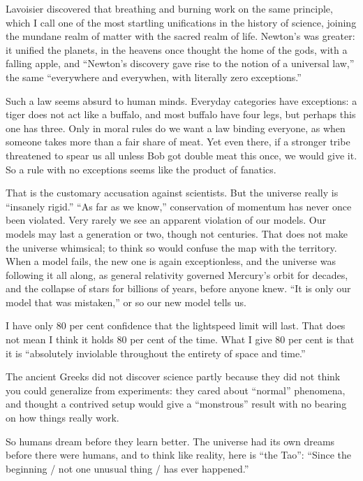 
Lavoisier discovered that breathing and burning work on the same principle, which I call one of the most startling unifications in the history of science, joining the mundane realm of matter with the sacred realm of life.  Newton's was greater: it unified the planets, in the heavens once thought the home of the gods, with a falling apple, and ``Newton's discovery gave rise to the notion of a universal law,'' the same ``everywhere and everywhen, with literally zero exceptions.'' 

Such a law seems absurd to human minds. Everyday categories have exceptions: a tiger does not act like a buffalo, and most buffalo have four legs, but perhaps this one has three. Only in moral rules do we want a law binding everyone, as when someone takes more than a fair share of meat. Yet even there, if a stronger tribe threatened to spear us all unless Bob got double meat this once, we would give it. So a rule with no exceptions seems like the product of fanatics.

That is the customary accusation against scientists. But the universe really is ``insanely rigid.'' ``As far as we know,'' conservation of momentum has never once been violated. Very rarely we see an apparent violation of our models. Our models may last a generation or two, though not centuries. That does not make the universe whimsical; to think so would confuse the map with the territory. When a model fails, the new one is again exceptionless, and the universe was following it all along, as general relativity governed Mercury's orbit for decades, and the collapse of stars for billions of years, before anyone knew. ``It is only our model that was mistaken,'' or so our new model tells us.

I have only 80 per cent confidence that the lightspeed limit will last. That does not mean I think it holds 80 per cent of the time. What I give 80 per cent is that it is ``absolutely inviolable throughout the entirety of space and time.''

The ancient Greeks did not discover science partly because they did not think you could generalize from experiments: they cared about ``normal'' phenomena, and thought a contrived setup would give a ``monstrous'' result with no bearing on how things really work. 

So humans dream before they learn better. The universe had its own dreams before there were humans, and to think like reality, here is ``the Tao'': ``Since the beginning / not one unusual thing / has ever happened.'' 
